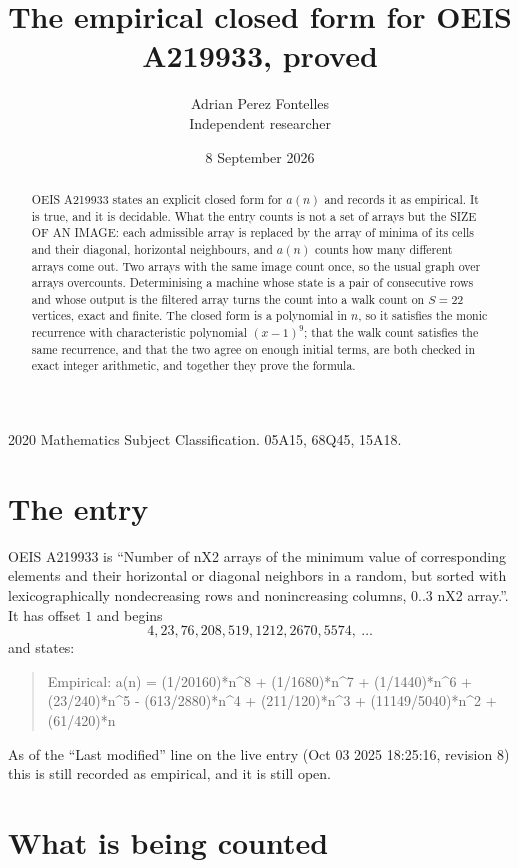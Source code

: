 \documentclass[11pt,a4paper]{article}
\title{The empirical closed form for OEIS A219933, proved}
\author{Adrian Perez Fontelles\\ \small Independent researcher}
\date{8 September 2026}
\theoremstyle{plain}
\theoremstyle{definition}
\begin{document}
\maketitle

\begin{abstract}
OEIS A219933 states an explicit closed form for $a(n)$ and records it as empirical. It is true, and
it is decidable. What the entry counts is not a set of arrays but the SIZE OF AN IMAGE: each
admissible array is replaced by the array of minima of its cells and their diagonal, horizontal neighbours,
and $a(n)$ counts how many different arrays come out. Two arrays with the same image count
once, so the usual graph over arrays overcounts. Determinising a machine whose state is a pair
of consecutive rows and whose output is the filtered array turns the count into a walk count on
$S=22$ vertices, exact and finite. The closed form is a polynomial in $n$, so it satisfies the
monic recurrence with characteristic polynomial $(x-1)^{9}$; that the walk count
satisfies the same recurrence, and that the two agree on enough initial terms, are both checked
in exact integer arithmetic, and together they prove the formula.
\end{abstract}

\noindent\small 2020 Mathematics Subject Classification. 05A15, 68Q45, 15A18.\normalsize

\section{The entry}

OEIS A219933 is ``Number of nX2 arrays of the minimum value of corresponding elements and their horizontal or diagonal neighbors in a random, but sorted with lexicographically nondecreasing rows and nonincreasing columns, 0..3 nX2 array.''. It has offset $1$ and begins
\[
4, 23, 76, 208, 519, 1212, 2670, 5574,\ \dots
\]
and states:
\begin{quote}
Empirical: a(n) = (1/20160)*n\^{}8 + (1/1680)*n\^{}7 + (1/1440)*n\^{}6 + (23/240)*n\^{}5 - (613/2880)*n\^{}4 + (211/120)*n\^{}3 + (11149/5040)*n\^{}2 + (61/420)*n
\end{quote}
As of the ``Last modified'' line on the live entry (Oct 03 2025 18:25:16, revision 8)
this is still recorded as empirical, and it is still open.

\section{What is being counted}
\end{document}
